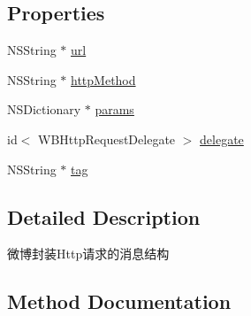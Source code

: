 \subsection*{Properties}
\begin{DoxyCompactItemize}
\item 
N\+S\+String $\ast$ \mbox{\hyperlink{interface_w_b_http_request_ab14044463e9ed636ee593032460f1756}{url}}
\item 
N\+S\+String $\ast$ \mbox{\hyperlink{interface_w_b_http_request_a7e5102d2bf646ba8b81bdc09d9adf104}{http\+Method}}
\item 
N\+S\+Dictionary $\ast$ \mbox{\hyperlink{interface_w_b_http_request_af50a6d6dc42792fb62e3816ccdfa6e66}{params}}
\item 
id$<$ W\+B\+Http\+Request\+Delegate $>$ \mbox{\hyperlink{interface_w_b_http_request_a0084d60c395e0c1ff24dd47aaab5ddce}{delegate}}
\item 
N\+S\+String $\ast$ \mbox{\hyperlink{interface_w_b_http_request_af57d807b75fedf0a238344ab13da0f49}{tag}}
\end{DoxyCompactItemize}


\subsection{Detailed Description}
微博封装\+Http请求的消息结构 

\subsection{Method Documentation}
\mbox{\label{interface_w_b_http_request_a49f7163ca8362f339d37df2b93e36d06}} 
